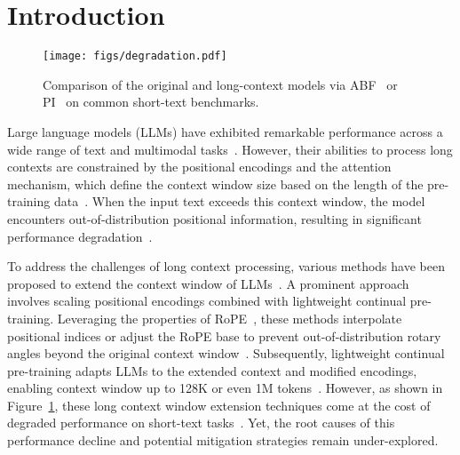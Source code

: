 \section{Introduction}
\label{sec:introduction}


\begin{figure}[htb]
    \centering
    \texttt{[image: figs/degradation.pdf]}
    \caption{Comparison of the original and long-context models via ABF~\cite{xiong-naacl-2024-effective} or PI~\cite{chen-arxiv-2023-extending} on common short-text benchmarks.}
    \label{fig:drop}
\end{figure}
Large language models (LLMs) have exhibited remarkable performance across a wide range of text and multimodal tasks~\cite{brown-nips-2020-gpt3,openai-arxiv-2023-gpt4,zhao-arxiv-2023-survey,Touvron-arxiv-2023-llama2,Dubey-arxiv-2023-llama3}. However, their abilities to process long contexts are constrained by the positional encodings and the attention mechanism, which define the context window size based on the length of the pre-training data~\cite{su-neurocomputing-2024-roformer,press-iclr-2022-alibi}. When the input text exceeds this context window, the model encounters out-of-distribution positional information, resulting in significant performance degradation~\cite{chen-arxiv-2023-extending,peng-arxiv-2023-yarn,dong-arxiv-2024-exploring}.



To address the challenges of long context processing, various methods have been proposed to extend the context window of LLMs~\cite{bloc97-reddit-2023-ntk,xiao-arxiv-2023-streaming,xiong-naacl-2024-effective,chen-arxiv-2023-extending}. A prominent approach involves scaling positional encodings combined with lightweight continual pre-training. Leveraging the properties of RoPE~\cite{su-neurocomputing-2024-roformer}, these methods interpolate positional indices or adjust the RoPE base to prevent out-of-distribution rotary angles beyond the original context window~\cite{chen-arxiv-2023-extending, ding-icml-2024-longrope, peng-arxiv-2023-yarn,xiong-naacl-2024-effective}. Subsequently, lightweight continual pre-training adapts LLMs to the extended context and modified encodings, enabling context window up to 128K or even 1M tokens~\cite{xiong-naacl-2024-effective,fu-icml-2024-data,Zeng-arxiv-2024-glm}. 
However, as shown in Figure~\ref{fig:drop}, these long context window extension techniques come at the cost of degraded performance on short-text tasks~\cite{xiong-naacl-2024-effective}. Yet, the root causes of this performance decline and potential mitigation strategies remain under-explored.


